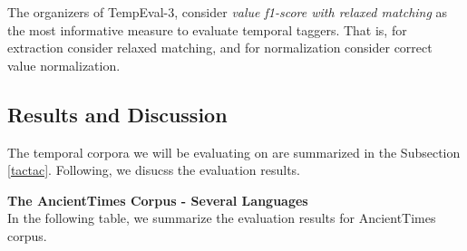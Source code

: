 The organizers of TempEval-3, consider \textit{value f1-score with relaxed matching} as the most informative measure to evaluate temporal taggers. That is, for extraction consider relaxed matching, and for normalization consider correct value normalization. 

\subsection{Results and Discussion}
The temporal corpora we will be evaluating on are summarized in the Subsection \ref{tactac}. Following, we disucss the evaluation results. 

\textbf{The AncientTimes Corpus - Several Languages}\\
In the following table, we summarize the evaluation results for AncientTimes corpus. 


